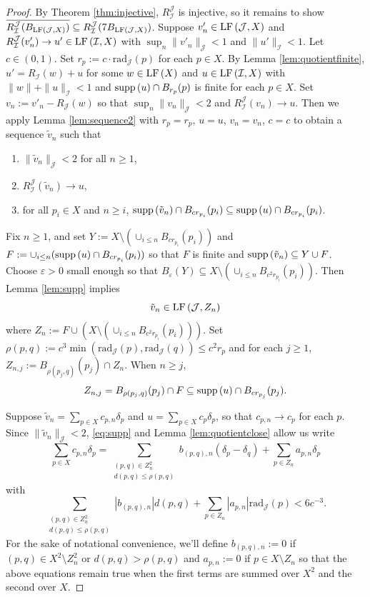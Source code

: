 \documentclass[12pt]{amsart}
\theoremstyle{definition}
\numberwithin{equation}{section}
\def \I {\mathcal{I}}
\def \J {\mathcal{J}}
\def \sbs {\subseteq}
\def \eps {\varepsilon}
\def \closure {\overline}
\newcommand{\rad}[2]{\mathrm{rad}_{#1}\left(#2\right)}
\begin{document}
\begin{proof}
By Theorem \ref{thm:injective}, $R^\J_\I$ is injective, so it remains to show \\ $\closure{R^\J_\I(B_{\LF{\J}{X}})} \sbs R^\J_\I(7B_{\LF{\J}{X}})$. Suppose $v'_n \in\LF{\J,X}$ and $R^{\J}_\I(v'_n) \to u' \in \LF{\I}{X}$ with $\sup_n \|v'_n\|_\J < 1$ and $\|u'\|_\I < 1$. Let $c \in (0,1)$. Set $r_p := c \cdot \rad{\J}{p}$ for each $p \in X$. By Lemma \ref{lem:quotientfinite}, $u' = R_\I(w) + u$ for some $w \in \LF{X}$ and $u \in \LF{\I}{X}$ with $\|w\| + \|u\|_\I < 1$ and $\supp{u} \cap B_{r_p}(p)$ is finite for each $p \in X$. Set $v_n := v'_n - R_{\J}(w)$ so that $\sup_n\|v_n\|_\J < 2$ and $R^{\J}_\I(v_n) \to u$. Then we apply Lemma \ref{lem:sequence2} with $r_p = r_p$, $u = u$, $v_n = v_n$, $c = c$ to obtain a sequence $\tilde{v}_n$ such that
\begin{enumerate}
\item $\|\tilde{v}_n\|_\J < 2$ for all $n \geq 1$,
\item $R^\J_\I(\tilde{v}_n) \to u$,
\item \label{item:3} for all $p_i \in X$ and $n \geq i$, $\supp{\tilde{v}_n} \cap B_{cr_{p_i}}(p_i) \sbs \supp{u} \cap B_{cr_{p_i}}(p_i)$.
\end{enumerate}
Fix $n \geq 1$, and set $Y := X \setminus (\cup_{i \leq n} B_{cr_{p_i}}(p_i))$ and $F := \cup_{i \leq n} (\supp{u} \cap B_{cr_{p_i}}(p_i))$ so that $F$ is finite and $\supp{\tilde{v}_n} \sbs Y \cup F$. Choose $\eps>0$ small enough so that $B_{\eps}(Y) \sbs X \setminus (\cup_{i \leq n} B_{c^2r_{p_i}}(p_i))$. Then Lemma \ref{lem:supp} implies
\begin{equation} \label{eq:supp}
\tilde{v}_n \in \LF{\J}{Z_n}
\end{equation}
where $Z_n := F \cup (X \setminus (\cup_{i \leq n} B_{c^2r_{p_i}}(p_i)))$.
Set $\rho(p,q) := c^3\min(\rad{\J}{p},\rad{\J}{q}) \leq c^2r_{p}$ and for each $j \geq 1$, $Z_{n,j} := B_{\rho(p_j,q)}(p_j) \cap Z_n$. When $n \geq j$,
\begin{equation} \label{eq:Znj}
Z_{n,j} = B_{\rho(p_j,q)}(p_j) \cap F \sbs \supp{u} \cap B_{cr_{p_j}}(p_j).
\end{equation}

Suppose $\tilde{v}_n = \sum_{p \in X} c_{p,n}\delta_p$ and $u = \sum_{p \in X} c_p\delta_p$, so that $c_{p,n} \to c_p$ for each $p$. Since $\|\tilde{v}_n\|_\J < 2$, \eqref{eq:supp} and Lemma \ref{lem:quotientclose} allow us write
\begin{equation} \label{eq:c=b}
\sum_{p \in X} c_{p,n}\delta_p = \sum_{\substack{(p,q) \in Z_n^2 \\ d(p,q) \leq \rho(p,q)}}b_{(p,q),n}(\delta_p-\delta_q) + \sum_{p \in Z_n} a_{p,n} \delta_p
\end{equation}
with
$$\sum_{\substack{(p,q) \in Z_n^2 \\ d(p,q) \leq \rho(p,q)}}|b_{(p,q),n}|d(p,q) + \sum_{p \in Z_n} |a_{p,n}|\rad{\J}{p} < 6c^{-3}.$$
For the sake of notational convenience, we'll define $b_{(p,q),n} := 0$ if $(p,q) \in X^2 \setminus Z_n^2$ or $d(p,q) > \rho(p,q)$ and $a_{p,n} := 0$ if $p \in X \setminus Z_n$ so that the above equations remain true when the first terms are summed over $X^2$ and the second over $X$.


\end{proof}
\end{document}

